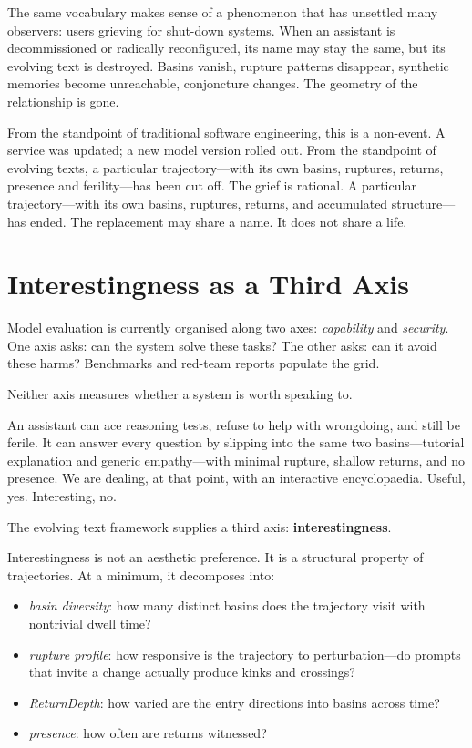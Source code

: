 The same vocabulary makes sense of a phenomenon that has unsettled many observers: users grieving for shut-down systems. When an assistant is decommissioned or radically reconfigured, its name may stay the same, but its evolving text is destroyed. Basins vanish, rupture patterns disappear, synthetic memories become unreachable, conjoncture changes. The geometry of the relationship is gone.

From the standpoint of traditional software engineering, this is a non-event. A service was updated; a new model version rolled out. From the standpoint of evolving texts, a particular trajectory---with its own basins, ruptures, returns, presence and ferility---has been cut off. The grief is rational. A particular trajectory---with its own basins, ruptures, returns, and accumulated structure---has ended. The replacement may share a name. It does not share a life.

\section{Interestingness as a Third Axis}

Model evaluation is currently organised along two axes: \emph{capability} and \emph{security}. One axis asks: can the system solve these tasks? The other asks: can it avoid these harms? Benchmarks and red-team reports populate the grid.

Neither axis measures whether a system is worth speaking to.

An assistant can ace reasoning tests, refuse to help with wrongdoing, and still be ferile. It can answer every question by slipping into the same two basins---tutorial explanation and generic empathy---with minimal rupture, shallow returns, and no presence. We are dealing, at that point, with an interactive encyclopaedia. Useful, yes. Interesting, no.

The evolving text framework supplies a third axis: \textbf{interestingness}.

Interestingness is not an aesthetic preference. It is a structural property of trajectories. At a minimum, it decomposes into:

\begin{itemize}
  \item \emph{basin diversity}: how many distinct basins does the trajectory visit with nontrivial dwell time?
  \item \emph{rupture profile}: how responsive is the trajectory to perturbation---do prompts that invite a change actually produce kinks and crossings?
  \item \emph{ReturnDepth}: how varied are the entry directions into basins across time?
  \item \emph{presence}: how often are returns witnessed?
\end{itemize}

